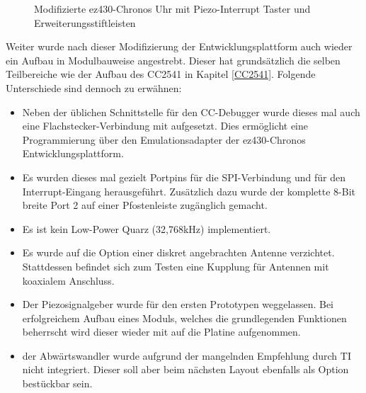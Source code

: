 \documentclass[12pt]{scrreprt} %
\begin{document}
\begin{figure}
\centering
{}
\caption[Modifizierte ez430-Chronos Uhr]{Modifizierte ez430-Chronos Uhr mit Piezo-Interrupt Taster und Erweiterungsstiftleisten}
\label{pic.breakout}
\end{figure}
Weiter wurde nach dieser Modifizierung der Entwicklungsplattform auch wieder ein Aufbau in Modulbauweise angestrebt. Dieser hat grundsätzlich die selben Teilbereiche wie der Aufbau des CC2541 in Kapitel \vref{CC2541}. Folgende Unterschiede sind dennoch zu erwähnen:
\begin{itemize}
\item
Neben der üblichen Schnittstelle für den CC-Debugger wurde dieses mal auch eine Flachstecker-Verbindung mit aufgesetzt. Dies ermöglicht eine Programmierung über den Emulationsadapter der ez430-Chronos Entwicklungsplattform.
\item
Es wurden dieses mal gezielt Portpins für die SPI-Verbindung und für den Interrupt-Eingang herausgeführt. Zusätzlich dazu wurde der komplette 8-Bit breite Port 2 auf einer Pfostenleiste zugänglich gemacht.
\item
Es ist kein Low-Power Quarz (32,768kHz) implementiert.
\item
Es wurde auf die Option einer diskret angebrachten Antenne verzichtet. Stattdessen befindet sich zum Testen eine Kupplung für Antennen mit koaxialem Anschluss.
\item
Der Piezosignalgeber wurde für den ersten Prototypen weggelassen. Bei erfolgreichem Aufbau eines Moduls, welches die grundlegenden Funktionen beherrscht wird dieser wieder mit auf die Platine aufgenommen.
\item
der Abwärtswandler wurde aufgrund der mangelnden Empfehlung durch TI nicht integriert. Dieser soll aber beim nächsten Layout ebenfalls als Option bestückbar sein.
\end{itemize}
\end{document}
